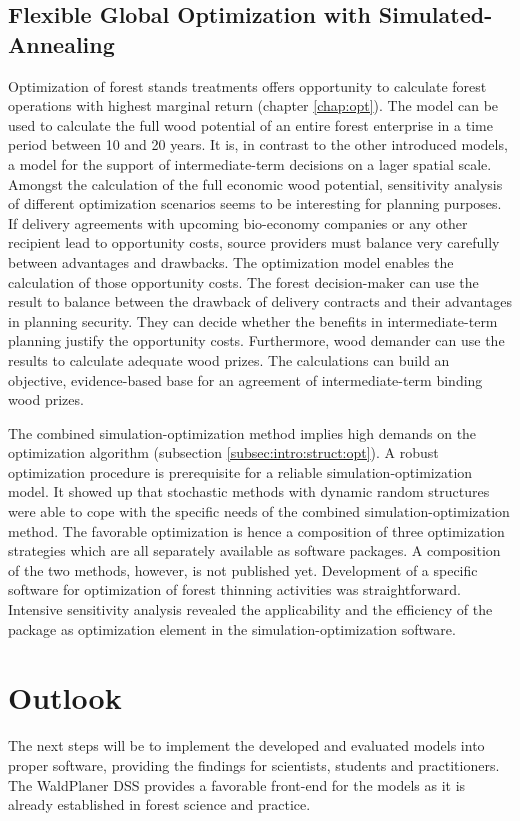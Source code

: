 \subsection{Flexible Global Optimization with Simulated-Annealing}
\label{subsec:discussion:struct:opt}
Optimization of forest stands treatments offers opportunity to calculate forest operations with highest marginal return (chapter \ref{chap:opt}). The model can be used to calculate the full wood potential of an entire forest enterprise in a time period between 10 and 20 years. It is, in contrast to the other introduced models, a model for the support of intermediate-term decisions on a lager spatial scale. Amongst the calculation of the full economic wood potential, sensitivity analysis of different optimization scenarios seems to be interesting for planning purposes. If delivery agreements with upcoming bio-economy companies or any other recipient lead to opportunity costs, source providers must balance very carefully between advantages and drawbacks. The optimization model enables the calculation of those opportunity costs. The forest decision-maker can use the result to balance between the drawback of delivery contracts and their advantages in planning security. They can decide whether the benefits in intermediate-term planning justify the opportunity costs. Furthermore, wood demander can use the results to calculate adequate wood prizes. The calculations can build an objective, evidence-based base for an agreement of intermediate-term binding wood prizes.

The combined simulation-optimization method implies high demands on the optimization algorithm (subsection \ref{subsec:intro:struct:opt}). A robust optimization procedure is prerequisite for a reliable simulation-optimization model. It showed up that stochastic methods with dynamic random structures were able to cope with the specific needs of the combined simulation-optimization method. The favorable optimization is hence a composition of three optimization strategies \citep{corana_1987, kirkpatrick_1983, pronzato_1984} which are all separately available as software packages. A composition of the two methods, however, is not published yet. Development of a specific software for optimization of forest thinning activities was straightforward. Intensive  sensitivity analysis revealed the applicability and the efficiency of the package as optimization element in the simulation-optimization software.

\section{Outlook}
\label{sec:discussion:outlook}
The next steps will be to implement the developed and evaluated models into proper software, providing the findings for scientists, students and practitioners. The WaldPlaner DSS provides a favorable front-end for the models as it is already established in forest science and practice.

